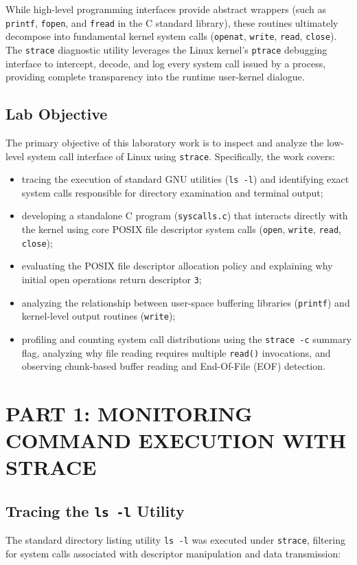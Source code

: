 \documentclass[12pt,a4paper]{report}
\numberwithin{equation}{chapter}
\numberwithin{figure}{chapter}
\numberwithin{table}{chapter}
\begin{document}
While high-level programming interfaces provide abstract wrappers (such as \texttt{printf}, \texttt{fopen}, and \texttt{fread} in the C standard library), these routines ultimately decompose into fundamental kernel system calls (\texttt{openat}, \texttt{write}, \texttt{read}, \texttt{close}). The \texttt{strace} diagnostic utility leverages the Linux kernel's \texttt{ptrace} debugging interface to intercept, decode, and log every system call issued by a process, providing complete transparency into the runtime user-kernel dialogue.

\section{Lab Objective}
The primary objective of this laboratory work is to inspect and analyze the low-level system call interface of Linux using \texttt{strace}. Specifically, the work covers:
\begin{itemize}
    \item tracing the execution of standard GNU utilities (\texttt{ls -l}) and identifying exact system calls responsible for directory examination and terminal output;
    \item developing a standalone C program (\texttt{syscalls.c}) that interacts directly with the kernel using core POSIX file descriptor system calls (\texttt{open}, \texttt{write}, \texttt{read}, \texttt{close});
    \item evaluating the POSIX file descriptor allocation policy and explaining why initial open operations return descriptor \texttt{3};
    \item analyzing the relationship between user-space buffering libraries (\texttt{printf}) and kernel-level output routines (\texttt{write});
    \item profiling and counting system call distributions using the \texttt{strace -c} summary flag, analyzing why file reading requires multiple \texttt{read()} invocations, and observing chunk-based buffer reading and End-Of-File (EOF) detection.
\end{itemize}

\chapter{PART 1: MONITORING COMMAND EXECUTION WITH STRACE}

\section{Tracing the \texttt{ls -l} Utility}
The standard directory listing utility \texttt{ls -l} was executed under \texttt{strace}, filtering for system calls associated with descriptor manipulation and data transmission:
\end{document}
